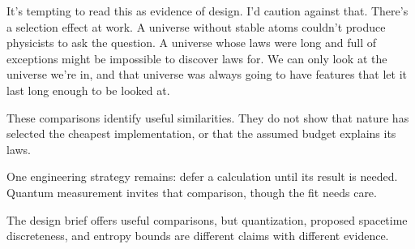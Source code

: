 It's tempting to read this as evidence of design. I'd caution against that. There's a selection effect at work. A universe without stable atoms couldn't produce physicists to ask the question. A universe whose laws were long and full of exceptions might be impossible to discover laws for. We can only look at the universe we're in, and that universe was always going to have features that let it last long enough to be looked at.

These comparisons identify useful similarities. They do not show that nature has selected the cheapest implementation, or that the assumed budget explains its laws.

One engineering strategy remains: defer a calculation until its result is needed. Quantum measurement invites that comparison, though the fit needs care.

\begin{keytakeawaybox}
The design brief offers useful comparisons, but quantization, proposed spacetime discreteness, and entropy bounds are different claims with different evidence.
\end{keytakeawaybox}
